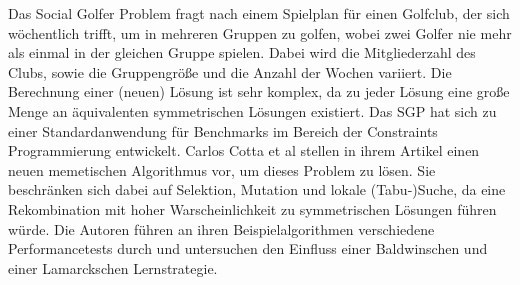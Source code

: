 Das Social Golfer Problem fragt nach einem Spielplan für einen Golfclub, der sich wöchentlich trifft, um in mehreren Gruppen zu golfen, wobei zwei Golfer nie mehr als einmal in der gleichen Gruppe spielen.
Dabei wird die Mitgliederzahl des Clubs, sowie die Gruppengröße und die Anzahl der Wochen variiert.
Die Berechnung einer (neuen) Lösung ist sehr komplex, da zu jeder Lösung eine große Menge an äquivalenten symmetrischen Lösungen existiert.
Das SGP hat sich zu einer Standardanwendung für Benchmarks im Bereich der Constraints Programmierung entwickelt.
Carlos Cotta et al stellen in ihrem Artikel \cite{cotta06} einen neuen memetischen Algorithmus vor, um dieses Problem zu lösen. 
Sie beschränken sich dabei auf Selektion, Mutation und lokale (Tabu-)Suche, da eine Rekombination mit hoher Warscheinlichkeit zu symmetrischen Lösungen führen würde.
Die Autoren führen an ihren Beispielalgorithmen verschiedene Performancetests durch und untersuchen den Einfluss einer Baldwinschen und einer Lamarckschen Lernstrategie.
